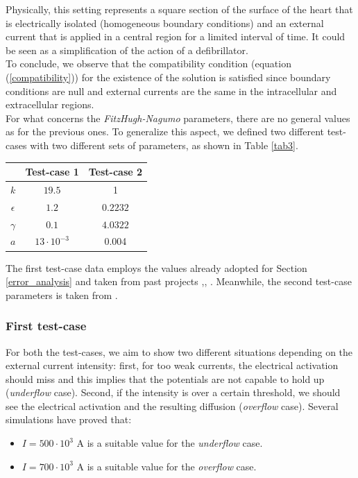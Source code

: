 \documentclass[a4paper,11pt]{article}
\begin{document}
\noindent Physically, this setting represents a square section of the surface of the heart that is electrically isolated (homogeneous boundary conditions) and an external current that is applied in a central region for a limited interval of time. It could be seen as a simplification of the action of a defibrillator. \\
To conclude, we observe that the compatibility condition (equation (\ref{compatibility})) for the existence of the solution is satisfied since boundary conditions are null and external currents are the same in the intracellular and extracellular regions. \\

\noindent For what concerns the \emph{FitzHugh-Nagumo} parameters, there are no general values as for the previous ones. To generalize this aspect, we defined two different test-cases with two different sets of parameters, as shown in Table \ref{tab3}.

\begin{center}
	\label{tab3}
	\begin{tabular}{|c|c|c|} 
		\hline 
		 & Test-case 1 & Test-case 2 \\
		\hline \hline
		$k$ & $19.5 $ & 1 \\
		\hline
		$\epsilon$ & $1.2$ & $0.2232$ \\ 
		\hline
		$\gamma$ & $0.1$ & $4.0322$ \\
		\hline
		$a$ & $13\cdot 10^{-3}$ & 0.004 \\
		\hline
	\end{tabular}
\end{center}

\vspace{4mm}
\noindent The first test-case data employs the values already adopted for Section \ref{error_analysis} and taken from past projects \cite{bagnara},\cite{andreotti}, \cite{marta}. Meanwhile, the second test-case parameters is taken from \cite{mauricio}.

\subsubsection{First test-case}
For both the test-cases, we aim to show two different situations depending on the external current intensity: first, for too weak currents, the electrical activation should miss and this implies that the potentials are not capable to hold up (\emph{underflow} case). Second, if the intensity is over a certain threshold, we should see the electrical activation and the resulting diffusion (\emph{overflow} case). Several simulations have proved that:
\begin{itemize}
	\item $I = 500 \cdot 10^3 $ A is a suitable value for the \emph{underflow} case.
	\item $I = 700 \cdot 10^3 $ A is a suitable value for the \emph{overflow} case.
\end{itemize}
\end{document}
